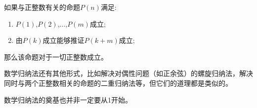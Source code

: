 \begin{principle}[跳跃数学归纳法]
  如果与正整数有关的命题$P(n)$满足:
  \begin{enumerate}
  \item $P(1)$,$P(2)$,$\ldots$,$P(m)$成立;
  \item 由$P(k)$成立能够推证$P(k+m)$成立;
  \end{enumerate}
那么该命题对于一切正整数成立。
\end{principle}

数学归纳法还有其他形式，比如解决对偶性问题（如正余弦）的螺旋归纳法，解决同时与两个正整数相关的命题的二重归纳法等，但它们的道理都是类似的。

数学归纳法的奠基也并非一定要从1开始。

